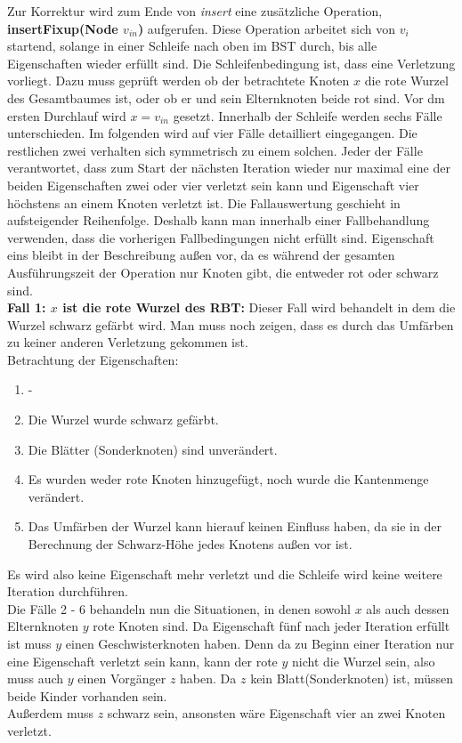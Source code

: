 \documentclass[a4paper,12pt]{article}
\begin{document}
 \noindent Zur Korrektur wird zum Ende von \textit{insert} eine zusätzliche Operation, \textbf{insertFixup(Node $v_{in}$)} aufgerufen. Diese Operation arbeitet sich von $v_i$ startend, solange in einer Schleife nach oben im BST durch, bis alle Eigenschaften wieder erfüllt sind. Die Schleifenbedingung ist, dass eine Verletzung vorliegt. Dazu muss geprüft werden ob der betrachtete Knoten $x$ die rote Wurzel des Gesamtbaumes ist, oder ob er und sein Elternknoten beide rot sind. Vor dm ersten Durchlauf wird $x = v_{in}$ gesetzt. Innerhalb der Schleife werden sechs Fälle unterschieden. Im folgenden wird auf vier Fälle detailliert eingegangen. Die restlichen zwei verhalten sich symmetrisch zu einem solchen. Jeder der Fälle verantwortet, dass zum Start der nächsten Iteration wieder nur maximal eine der beiden Eigenschaften zwei oder vier verletzt sein kann und Eigenschaft vier höchstens an einem Knoten verletzt ist. Die Fallauswertung geschieht in aufsteigender Reihenfolge. Deshalb kann man innerhalb einer Fallbehandlung verwenden, dass die vorherigen Fallbedingungen nicht erfüllt sind. Eigenschaft eins bleibt in der Beschreibung außen vor, da es während der gesamten Ausführungszeit der Operation nur Knoten gibt, die entweder rot oder schwarz sind. \\
 
\noindent\textbf{Fall 1: $x$ ist die rote Wurzel des RBT: }
Dieser Fall wird behandelt in dem die Wurzel schwarz gefärbt wird. Man muss noch zeigen, dass es durch das Umfärben zu keiner anderen Verletzung gekommen ist.\\

Betrachtung der Eigenschaften:
\begin{enumerate}
	\item -
	\item Die Wurzel wurde schwarz gefärbt.
	\item Die Blätter (Sonderknoten) sind unverändert.
	\item Es wurden weder rote Knoten hinzugefügt, noch wurde die Kantenmenge verändert. 
	\item Das Umfärben der Wurzel kann hierauf keinen Einfluss haben, da sie in der Berechnung der Schwarz-Höhe jedes Knotens außen vor ist.
\end{enumerate}  

\noindent Es wird also keine Eigenschaft mehr verletzt und die Schleife wird keine weitere Iteration durchführen.\\
 Die Fälle 2 - 6 behandeln nun die Situationen, in denen sowohl $x$ als auch dessen Elternknoten $y$ rote Knoten sind. Da Eigenschaft fünf nach jeder Iteration erfüllt ist muss $y$ einen Geschwisterknoten haben. Denn da zu Beginn einer Iteration nur eine Eigenschaft verletzt sein kann, kann der rote $y$ nicht die Wurzel sein, also muss auch $y$ einen Vorgänger $z$ haben. Da $z$ kein Blatt(Sonderknoten) ist, müssen beide Kinder vorhanden sein.\\
  Außerdem muss $z$ schwarz sein, ansonsten wäre Eigenschaft vier an zwei Knoten verletzt.\\
 
\end{document}
